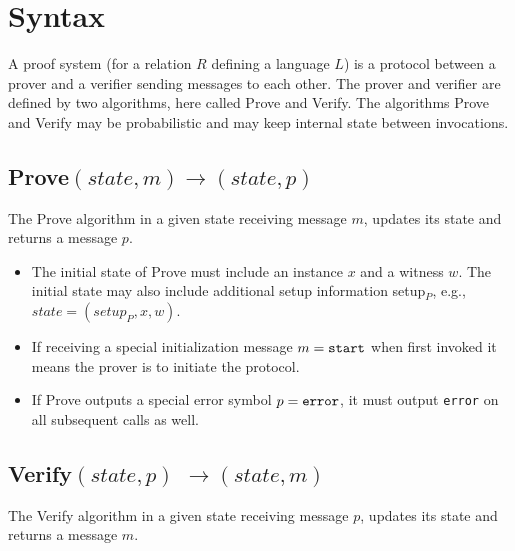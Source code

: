 \section{Syntax}
\label{security:syntax}
 
A proof system (for a relation $R$ defining a language $L$) is a protocol between a prover and a verifier sending messages to each other. 
The prover and verifier are defined by two algorithms, here called Prove and Verify. 
The algorithms Prove and Verify may be probabilistic and may keep internal state between invocations.



\subsection[Prove]{\textbf{Prove}$(state, m) \rightarrow (state, p)$}
\label{security:syntax:prove}

The Prove algorithm in a given state receiving message $m$, updates its state and returns a message $p$.\loosen

\begin{itemize}
\item The initial state of Prove must include an instance $x$ and a witness $w$. 
	The initial state may also include additional setup information setup$_P$, e.g., $state = (setup_P, x, w)$.
\item If receiving a special initialization message $m = \tt start$ when first invoked it means the prover is to initiate the protocol.
\item If Prove outputs a special error symbol $p = \tt error$, it must output {\tt error} on all subsequent calls as well.
\end{itemize}


\subsection[Verify]{\textbf{Verify}$(state, p)$ $\rightarrow (state, m)$}
\label{security:syntax:verify}

The Verify algorithm in a given state receiving message $p$, updates its state and returns a message $m$.\loosen

